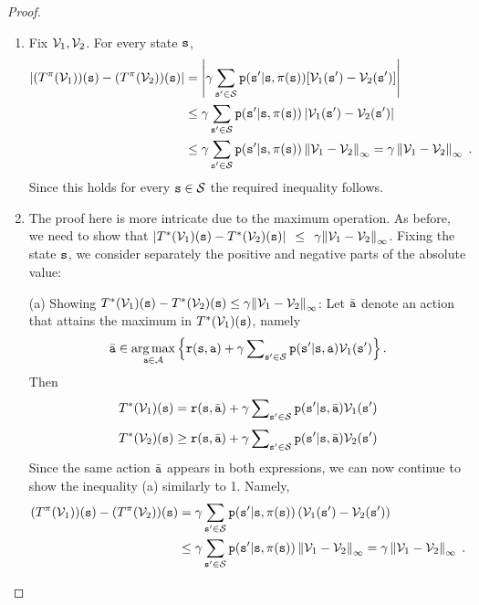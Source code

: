 \begin{proof}
\begin{enumerate}
  \item Fix ${\mathcal{V}_1},{\mathcal{V}_2}$. For every state ${\tt s}$,
\begin{align*}
\left| (T^\pi (\mathcal{V}_1))({\tt s}) - (T^\pi (\mathcal{V}_2))({\tt s}) \right| &= \left| {\gamma \sum_{{\tt s}'\in \mathcal{S}} {{\tt p}({\tt s}'|{\tt s},\pi({\tt s}))[\mathcal{V}_1({\tt s}') - \mathcal{V}_2({\tt s}')]} } \right|\\
 &\le \gamma \sum_{{\tt s}'\in \mathcal{S}} {\tt p}({\tt s}'|{\tt s},\pi({\tt s}))\left| \mathcal{V}_1({\tt s}') - \mathcal{V}_2({\tt s}') \right| \\
 &\le \gamma \sum_{{\tt s}'\in \mathcal{S}} {\tt p}({\tt s}'|{\tt s},\pi ({\tt s})) \left\|\mathcal{V}_1 - \mathcal{V}_2 \right\|_\infty  = \gamma \left\| {{\mathcal{V}_1} - {\mathcal{V}_2}} \right\|_\infty \;.
\end{align*}
Since this holds for every ${\tt s} \in \mathcal{S}$ the required
inequality follows.
  \item
The proof here is more intricate due to the maximum operation. As
before, we need to show that  $|T_{}^*({\mathcal{V}_1})({\tt s}) -
T_{}^*({\mathcal{V}_2})({\tt s})|\;\, \le \;\,\gamma {\left\|
{{\mathcal{V}_1} - {\mathcal{V}_2}} \right\|_\infty }$. Fixing the state
${\tt s}$, we consider separately the positive and negative parts of
the absolute value:

(a) Showing $T_{}^*({\mathcal{V}_1})({\tt s}) - T_{}^*({\mathcal{V}_2})({\tt s})
\le \gamma {\left\| {{\mathcal{V}_1} - {\mathcal{V}_2}} \right\|_\infty }$:
Let $\bar {{\tt a}}$ denote an action that attains the maximum in
$T_{}^*({\mathcal{V}_1})({\tt s})$, namely
\[
\bar {{\tt a}} \in \mathop {\arg \max }\limits_{{\tt a} \in \mathcal{A}}
\left\{ {{\tt r}({\tt s},{\tt a}) + \gamma \sum\nolimits_{{\tt s}'
\in \mathcal{S}} {{\tt p}({\tt s}'|{\tt s},{\tt a}){\mathcal{V}_1}({\tt s}')} }
\right\}.
\]
 Then
\[T_{}^*({\mathcal{V}_1})({\tt s}) = {\tt r}({\tt s},\bar {{\tt a}}) + \gamma \sum\nolimits_{{\tt s}' \in \mathcal{S}} {{\tt p}({\tt s}'|{\tt s},\bar {{\tt a}}){\mathcal{V}_1}({\tt s}')} \]
\[T_{}^*({\mathcal{V}_2})({\tt s}) \ge {\tt r}({\tt s},\bar {{\tt a}}) + \gamma \sum\nolimits_{{\tt s}' \in \mathcal{S}} {{\tt p}({\tt s}'|{\tt s},\bar {{\tt a}})\mathcal{V}_2({\tt s}')} \]
Since the same action $\bar {{\tt a}}$ appears in both expressions, we
can now continue to show the inequality (a) similarly to 1. Namely,
\begin{align*}
 (T^\pi (\mathcal{V}_1))({\tt s}) - (T^\pi (\mathcal{V}_2))({\tt s})  &= \gamma \sum_{{\tt s}'\in \mathcal{S}} {\tt p}({\tt s}'|{\tt s},\pi({\tt s}))\left( \mathcal{V}_1({\tt s}') - \mathcal{V}_2({\tt s}') \right) \\
 &\le \gamma \sum_{{\tt s}'\in \mathcal{S}} {\tt p}({\tt s}'|{\tt s},\pi ({\tt s})) \left\|\mathcal{V}_1 - \mathcal{V}_2 \right\|_\infty  = \gamma \left\| {{\mathcal{V}_1} - {\mathcal{V}_2}} \right\|_\infty \;.
\end{align*}


\end{enumerate}
\end{proof}
